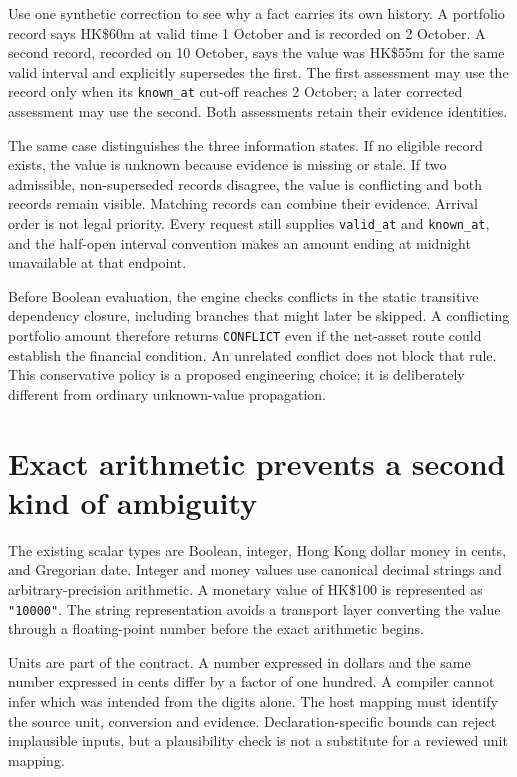 Use one synthetic correction to see why a fact carries its own history. A portfolio
record says HK\$60m at valid time 1 October and is recorded on 2 October. A second
record, recorded on 10 October, says the value was HK\$55m for the same valid
interval and explicitly supersedes the first. The first assessment may use the
record only when its \texttt{known\_at} cut-off reaches 2 October; a later corrected
assessment may use the second. Both assessments retain their evidence identities.

The same case distinguishes the three information states. If no eligible record exists,
the value is unknown because evidence is missing or stale. If two admissible,
non-superseded records disagree, the value is conflicting and both records remain
visible. Matching records can combine their evidence. Arrival order is not legal
priority. Every request still supplies \texttt{valid\_at} and \texttt{known\_at},
and the half-open interval convention makes an amount ending at midnight unavailable at that endpoint.


Before Boolean evaluation, the engine checks conflicts in the static transitive
dependency closure, including branches that might later be skipped. A conflicting
portfolio amount therefore returns \texttt{CONFLICT} even if the net-asset route
could establish the financial condition. An unrelated conflict does not block
that rule. This conservative policy is a proposed engineering choice; it is
deliberately different from ordinary unknown-value propagation.

\section{Exact arithmetic prevents a second kind of ambiguity}
\label{merge:M07:02}


The existing scalar types are Boolean, integer, Hong Kong dollar money in cents,
and Gregorian date. Integer and money values use canonical decimal strings and
arbitrary-precision arithmetic. A monetary value of HK\$100 is represented as
\texttt{"10000"}. The string representation avoids a transport layer converting
the value through a floating-point number before the exact arithmetic begins.

Units are part of the contract. A number expressed in dollars and the same number
expressed in cents differ by a factor of one hundred. A compiler cannot infer
which was intended from the digits alone. The host mapping must identify the
source unit, conversion and evidence. Declaration-specific bounds can reject
implausible inputs, but a plausibility check is not a substitute for a reviewed
unit mapping.

